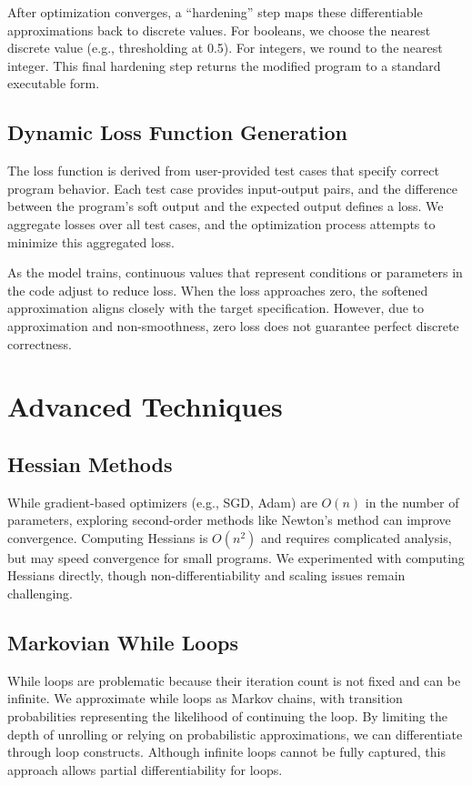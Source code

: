 \documentclass{article}
\begin{document}
After optimization converges, a ``hardening'' step maps these differentiable approximations back to discrete values. For booleans, we choose the nearest discrete value (e.g., thresholding at 0.5). For integers, we round to the nearest integer. This final hardening step returns the modified program to a standard executable form.

\subsection{Dynamic Loss Function Generation}
The loss function is derived from user-provided test cases that specify correct program behavior. Each test case provides input-output pairs, and the difference between the program's soft output and the expected output defines a loss. We aggregate losses over all test cases, and the optimization process attempts to minimize this aggregated loss.

As the model trains, continuous values that represent conditions or parameters in the code adjust to reduce loss. When the loss approaches zero, the softened approximation aligns closely with the target specification. However, due to approximation and non-smoothness, zero loss does not guarantee perfect discrete correctness.

\section{Advanced Techniques}

\subsection{Hessian Methods}
While gradient-based optimizers (e.g., SGD, Adam) are $O(n)$ in the number of parameters, exploring second-order methods like Newton's method can improve convergence. Computing Hessians is $O(n^2)$ and requires complicated analysis, but may speed convergence for small programs. We experimented with computing Hessians directly, though non-differentiability and scaling issues remain challenging.

\subsection{Markovian While Loops}
While loops are problematic because their iteration count is not fixed and can be infinite. We approximate while loops as Markov chains, with transition probabilities representing the likelihood of continuing the loop. By limiting the depth of unrolling or relying on probabilistic approximations, we can differentiate through loop constructs. Although infinite loops cannot be fully captured, this approach allows partial differentiability for loops.
\end{document}
